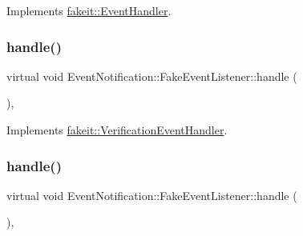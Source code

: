 Implements \mbox{\hyperlink{structfakeit_1_1EventHandler_a4de5ad05e5de73e36f4b2cede6d8efd3}{fakeit\+::\+Event\+Handler}}.

\mbox{\label{classEventNotification_1_1FakeEventListener_ac6942db8918e86b3bbd7bf4379021b7c}} 
\subsubsection{\texorpdfstring{handle()}{handle()}\hspace{0.1cm}{\footnotesize\ttfamily [2/3]}}
{\footnotesize\ttfamily virtual void Event\+Notification\+::\+Fake\+Event\+Listener\+::handle (\begin{DoxyParamCaption}\item[{const \mbox{\hyperlink{structfakeit_1_1SequenceVerificationEvent}{Sequence\+Verification\+Event}} \&}]{ }\end{DoxyParamCaption})\hspace{0.3cm}{\ttfamily [inline]}, {\ttfamily [virtual]}}



Implements \mbox{\hyperlink{structfakeit_1_1VerificationEventHandler_adf355a9888bc2bf78ce0e1219bfb1379}{fakeit\+::\+Verification\+Event\+Handler}}.

\mbox{\label{classEventNotification_1_1FakeEventListener_a893aba2096af31fc87a179bf5adf9af4}} 
\subsubsection{\texorpdfstring{handle()}{handle()}\hspace{0.1cm}{\footnotesize\ttfamily [3/3]}}
{\footnotesize\ttfamily virtual void Event\+Notification\+::\+Fake\+Event\+Listener\+::handle (\begin{DoxyParamCaption}\item[{const \mbox{\hyperlink{structfakeit_1_1NoMoreInvocationsVerificationEvent}{No\+More\+Invocations\+Verification\+Event}} \&}]{ }\end{DoxyParamCaption})\hspace{0.3cm}{\ttfamily [inline]}, {\ttfamily [virtual]}}



